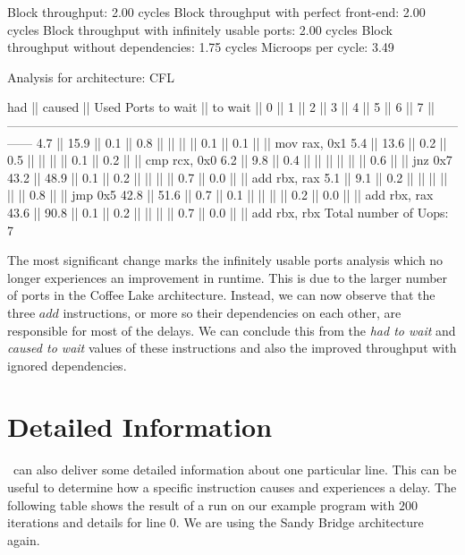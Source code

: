 \begin{example}
Block throughput: 2.00 cycles
Block throughput with perfect front-end: 2.00 cycles
Block throughput with infinitely usable ports: 2.00 cycles
Block throughput without dependencies: 1.75 cycles
Microops per cycle: 3.49

Analysis for architecture: CFL

   had   || caused  ||            Used Ports
 to wait || to wait ||   0   ||   1   ||   2   ||   3   ||   4   ||   5   ||   6   ||   7   ||
------------------------------------------------------------------------------------------------------------------
   4.7   ||  15.9   ||  0.1  ||  0.8  ||       ||       ||       ||  0.1  ||  0.1  ||       || mov rax, 0x1
   5.4   ||  13.6   ||  0.2  ||  0.5  ||       ||       ||       ||  0.1  ||  0.2  ||       || cmp rcx, 0x0
   6.2   ||   9.8   ||  0.4  ||       ||       ||       ||       ||       ||  0.6  ||       || jnz 0x7
  43.2   ||  48.9   ||  0.1  ||  0.2  ||       ||       ||       ||  0.7  ||  0.0  ||       || add rbx, rax
   5.1   ||   9.1   ||  0.2  ||       ||       ||       ||       ||       ||  0.8  ||       || jmp 0x5
  42.8   ||  51.6   ||  0.7  ||  0.1  ||       ||       ||       ||  0.2  ||  0.0  ||       || add rbx, rax
  43.6   ||  90.8   ||  0.1  ||  0.2  ||       ||       ||       ||  0.7  ||  0.0  ||       || add rbx, rbx
Total number of Uops: 7
\end{example}

The most significant change marks the infinitely usable ports analysis which no longer experiences an improvement in runtime. This is due to the larger number of ports in the Coffee Lake architecture. Instead, we can now observe that the three $add$ instructions, or more so their dependencies on each other, are responsible for most of the delays. We can conclude this from the \emph{had to wait} and \emph{caused to wait} values of these instructions and also the improved throughput with ignored dependencies.



\section{Detailed Information}
\label{sec:detail}

\suaca\ can also deliver some detailed information about one particular line. This can be useful to determine how a specific instruction causes and experiences a delay. The following table shows the result of a run on our example program with $200$ iterations and details for line $0$. We are using the Sandy Bridge architecture again.

